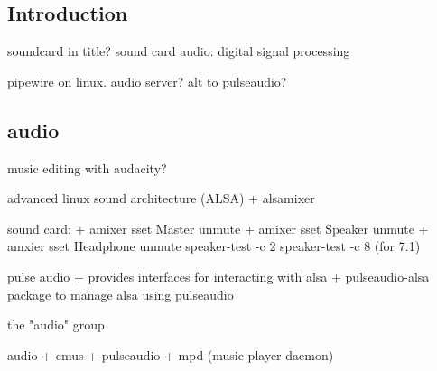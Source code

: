 
\subsection{Introduction}

soundcard in title?
sound card
audio: digital signal processing

pipewire on linux. audio server? alt to pulseaudio?

\subsection{audio}

music editing with  audacity?

advanced linux sound architecture (ALSA)
+ alsamixer

sound card:
+ amixer sset Master unmute
+ amixer sset Speaker unmute
+ amxier sset Headphone unmute
speaker-test -c 2
speaker-test -c 8 (for 7.1)

pulse audio
+ provides interfaces for interacting with alsa
+ pulseaudio-alsa package to manage alsa using pulseaudio

the "audio" group

audio
+ cmus
+ pulseaudio
+ mpd (music player daemon)

